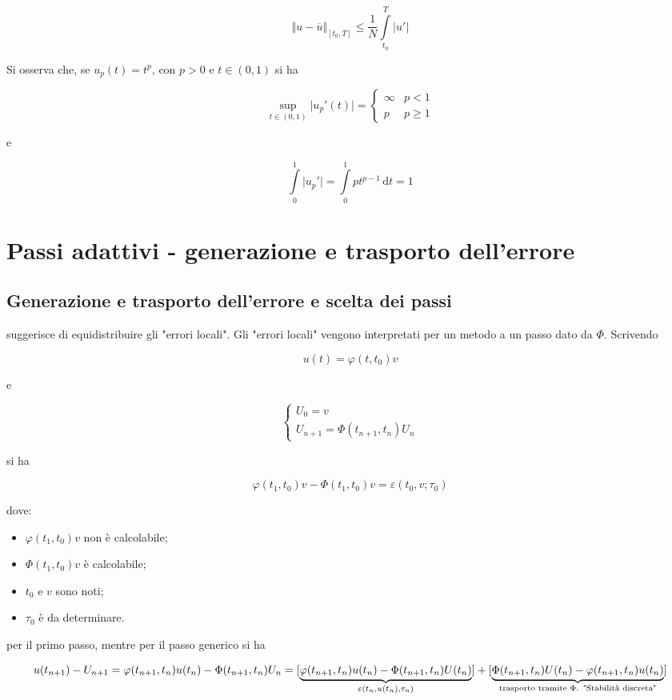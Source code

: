 \documentclass[hidelinks, 10pt]{report}
\begin{document}
\[ \Vert u - \overline{u} \Vert_{[t_{0}, T]} \le \frac{1}{N} \int\limits_{t_{0}}^{T} \vert u' \vert \]

Si osserva che, se $ u_{p} (t) = t^{p} $, con $ p > 0 $ e $ t \in (0, 1) $ si ha

\[ \sup\limits_{t \in (0, 1)} \vert u_{p}' (t) \vert = \begin{cases} \infty & p < 1 \\ p & p \ge 1 \end{cases} \]

e

\[ \int\limits_{0}^{1} \vert u_{p}' \vert = \int\limits_{0}^{1} p t^{p - 1} \, \mathrm{d}t = 1 \]

\section{Passi adattivi - generazione e trasporto dell'errore}
\subsection{Generazione e trasporto dell'errore e scelta dei passi}

 suggerisce di equidistribuire gli "errori locali". Gli "errori locali" vengono interpretati per un metodo a un passo dato da $ \Phi $. Scrivendo

\[ u(t) = \varphi(t, t_{0}) v \]

e

\[
\begin{cases}
U_{0} = v \\
U_{n + 1} = \Phi(t_{n + 1}, t_{n}) U_{n}
\end{cases}
\]

si ha

\[ \varphi(t_{1}, t_{0}) v - \Phi(t_{1}, t_{0}) v = \varepsilon(t_{0}, v; \tau_{0}) \]

dove:
\begin{itemize}
\item $ \varphi(t_{1}, t_{0}) v $ non \`e calcolabile;
\item $ \Phi(t_{1}, t_{0}) v $ \`e calcolabile;
\item $ t_{0} $ e $ v $ sono noti;
\item $ \tau_{0} $ \`e da determinare.
\end{itemize}

per il primo passo, mentre per il passo generico si ha

\begin{dmath*}
u(t_{n + 1}) - U_{n + 1} = \varphi(t_{n + 1}, t_{n}) u(t_{n}) - \Phi (t_{n + 1}, t_{n}) U_{n} = [ \underbrace{\varphi(t_{n + 1}, t_{n}) u(t_{n}) - \Phi (t_{n + 1}, t_{n}) U(t_{n})}_{\varepsilon(t_{n}, u(t_{n}), \tau_{n})}] + [\underbrace{\Phi (t_{n + 1}, t_{n}) U(t_{n}) - \varphi(t_{n + 1}, t_{n}) u(t_{n})}_{\text{trasporto tramite $ \Phi $. "Stabilit\`a discreta"}}]
\end{dmath*}
\end{document}

